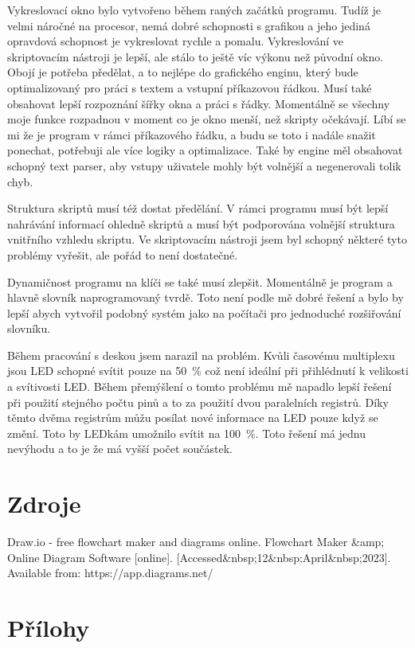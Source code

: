\documentclass[12pt,a4paper]{article}
\begin{document}
Vykreslovací okno bylo vytvořeno během raných začátků programu. Tudíž je velmi náročné na procesor, nemá dobré schopnosti s grafikou a jeho jediná opravdová schopnost je vykreslovat rychle a pomalu. Vykreslování ve skriptovacím nástroji je lepší, ale stálo to ještě víc výkonu než původní okno. Obojí je potřeba předělat, a to nejlépe do grafického enginu, který bude optimalizovaný pro práci s textem a vstupní příkazovou řádkou. Musí také obsahovat lepší rozpoznání šířky okna a práci s řádky. Momentálně se všechny moje funkce rozpadnou v moment co je okno menší, než skripty očekávají. Líbí se mi že je program v rámci příkazového řádku, a budu se toto i nadále snažit ponechat, potřebuji ale více logiky a optimalizace. Také by engine měl obsahovat schopný text parser, aby vstupy uživatele mohly být volnější a negenerovali tolik chyb.

Struktura skriptů musí též dostat předělání. V rámci programu musí být lepší nahrávání informací ohledně skriptů a musí být podporována volnější struktura vnitřního vzhledu skriptu. Ve skriptovacím nástroji jsem byl schopný některé tyto problémy vyřešit, ale pořád to není dostatečné.

Dynamičnost programu na klíči se také musí zlepšit. Momentálně je program a hlavně slovník naprogramovaný tvrdě. Toto není podle mě dobré řešení a bylo by lepší abych vytvořil podobný systém jako na počítači pro jednoduché rozšiřování slovníku.

Během pracování s deskou jsem narazil na problém. Kvůli časovému multiplexu jsou LED schopné svítit pouze na 50~\% což není ideální při přihlédnutí k velikosti a svítivosti LED. Během přemýšlení o tomto problému mě napadlo lepší řešení při použití stejného počtu pinů a to za použití dvou paralelních registrů. Díky těmto dvěma registrům můžu posílat nové informace na LED pouze když se změní. Toto by LEDkám umožnilo svítit na 100~\%. Toto řešení má jednu nevýhodu a to je že má vyšší počet součástek.

\section{Zdroje}
Draw.io - free flowchart maker and diagrams online. Flowchart Maker \&amp; Online Diagram Software [online]. [Accessed\&nbsp;12\&nbsp;April\&nbsp;2023]. Available from: https://app.diagrams.net/ 
\section{Přílohy}
\end{document}
